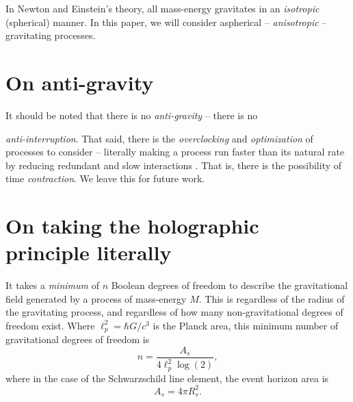 \documentclass[12pt]{article}
\begin{document}
In Newton and Einstein's theory, all mass-energy gravitates in an {\textit{isotropic}} (spherical) manner.
In this paper, we will consider aspherical -- {\textit{anisotropic}} -- gravitating processes.







\section{On anti-gravity}

It should be noted that there is no {\textit{anti-gravity}} -- there is no {\textit{anti-interruption}.
That said, there is the {\textit{overclocking}} and {\textit{optimization}} of processes to consider -- literally making a process run faster than its natural rate by reducing redundant and slow interactions \cite{wainner, mcconnell, pikus}.
That is, there is the possibility of time {\textit{contraction}}.
We leave this for future work.






\section{On taking the holographic principle literally}

It takes a {\textit{minimum}} of $n$ Boolean degrees of freedom to describe the gravitational field \cite{hooft, susskind, bousso} generated by a process of mass-energy $M$.
This is regardless of the radius of the gravitating process, and regardless of how many non-gravitational degrees of freedom exist.
Where $\ell_p^2 = \hbar G / c^3$ is the Planck area, this minimum number of gravitational degrees of freedom is
\begin{equation}
n = \frac{A_s}{4 \ell_p^2 \log(2)},
\end{equation}
where in the case of the Schwarzschild line element, the event horizon area is
\begin{equation}
A_s = 4 \pi R_s^2.
\end{equation}

}
\end{document}
